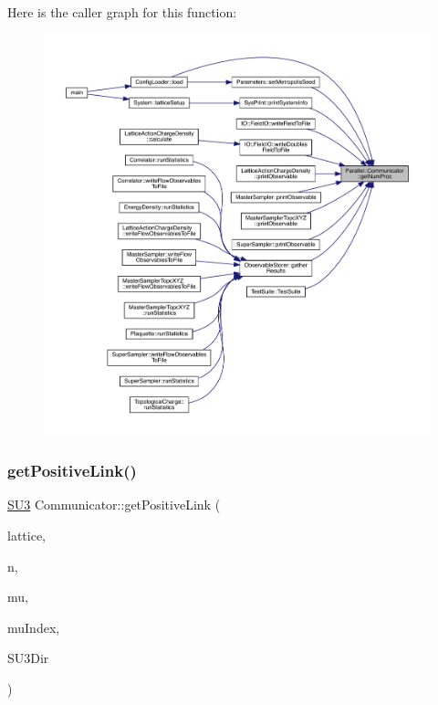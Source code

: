 Here is the caller graph for this function\+:
\nopagebreak
\begin{figure}[H]
\begin{center}
\leavevmode
\includegraphics[width=350pt]{class_parallel_1_1_communicator_a7b1f80fb49a0cc83f2031c3415174150_icgraph}
\end{center}
\end{figure}
\mbox{\label{class_parallel_1_1_communicator_a1c8d402df4a44becc1cab7a762f51432}} 
\subsubsection{\texorpdfstring{getPositiveLink()}{getPositiveLink()}}
{\footnotesize\ttfamily \mbox{\hyperlink{class_s_u3}{S\+U3}} Communicator\+::get\+Positive\+Link (\begin{DoxyParamCaption}\item[{\mbox{\hyperlink{class_lattice}{Lattice}}$<$ \mbox{\hyperlink{class_s_u3}{S\+U3}} $>$ $\ast$}]{lattice,  }\item[{std\+::vector$<$ int $>$}]{n,  }\item[{int}]{mu,  }\item[{int $\ast$}]{mu\+Index,  }\item[{int}]{S\+U3\+Dir }\end{DoxyParamCaption})\hspace{0.3cm}{\ttfamily [static]}}

